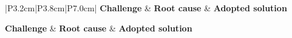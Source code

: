 \begin{longtable}{|P{3.2cm}|P{3.8cm}|P{7.0cm}|}
	\hline
	\textbf{\color{white}Challenge} & \textbf{\color{white}Root cause} & \textbf{\color{white}Adopted solution} \\
	\hline
	\endfirsthead

	\hline
	\textbf{\color{white}Challenge} & \textbf{\color{white}Root cause} & \textbf{\color{white}Adopted solution} \\
	\hline
	\endhead

	\hline
	 \\
	\endfoot

	\hline
	\endlastfoot


\end{longtable}
